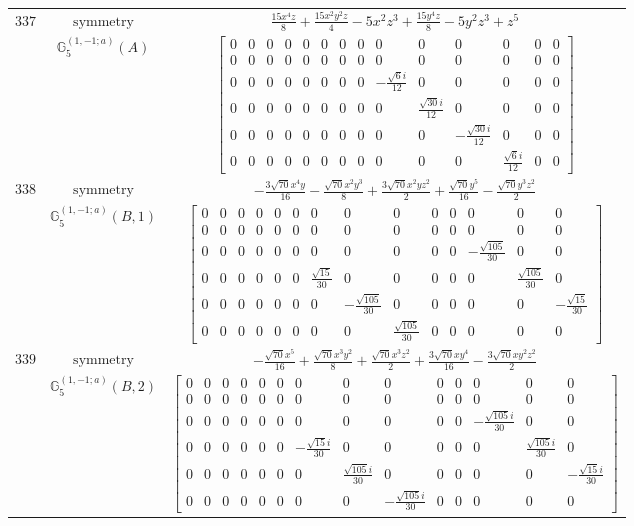 \documentclass[fleqn,8pt,landscape]{jsarticle}
\begin{document}
\begin{longtable}{ccc}
$ 337 $ & $ \text{symmetry} $ & $ \frac{15 x^{4} z}{8} + \frac{15 x^{2} y^{2} z}{4} - 5 x^{2} z^{3} + \frac{15 y^{4} z}{8} - 5 y^{2} z^{3} + z^{5} $ \\
$  $ & $ \mathbb{G}_{5}^{(1,-1;a)}(A) $ & $ \begin{bmatrix} 0 & 0 & 0 & 0 & 0 & 0 & 0 & 0 & 0 & 0 & 0 & 0 & 0 & 0 \\ 0 & 0 & 0 & 0 & 0 & 0 & 0 & 0 & 0 & 0 & 0 & 0 & 0 & 0 \\ 0 & 0 & 0 & 0 & 0 & 0 & 0 & 0 & - \frac{\sqrt{6} i}{12} & 0 & 0 & 0 & 0 & 0 \\ 0 & 0 & 0 & 0 & 0 & 0 & 0 & 0 & 0 & \frac{\sqrt{30} i}{12} & 0 & 0 & 0 & 0 \\ 0 & 0 & 0 & 0 & 0 & 0 & 0 & 0 & 0 & 0 & - \frac{\sqrt{30} i}{12} & 0 & 0 & 0 \\ 0 & 0 & 0 & 0 & 0 & 0 & 0 & 0 & 0 & 0 & 0 & \frac{\sqrt{6} i}{12} & 0 & 0 \end{bmatrix} $ \\ \hline
$ 338 $ & $ \text{symmetry} $ & $ - \frac{3 \sqrt{70} x^{4} y}{16} - \frac{\sqrt{70} x^{2} y^{3}}{8} + \frac{3 \sqrt{70} x^{2} y z^{2}}{2} + \frac{\sqrt{70} y^{5}}{16} - \frac{\sqrt{70} y^{3} z^{2}}{2} $ \\
$  $ & $ \mathbb{G}_{5}^{(1,-1;a)}(B,1) $ & $ \begin{bmatrix} 0 & 0 & 0 & 0 & 0 & 0 & 0 & 0 & 0 & 0 & 0 & 0 & 0 & 0 \\ 0 & 0 & 0 & 0 & 0 & 0 & 0 & 0 & 0 & 0 & 0 & 0 & 0 & 0 \\ 0 & 0 & 0 & 0 & 0 & 0 & 0 & 0 & 0 & 0 & 0 & - \frac{\sqrt{105}}{30} & 0 & 0 \\ 0 & 0 & 0 & 0 & 0 & 0 & \frac{\sqrt{15}}{30} & 0 & 0 & 0 & 0 & 0 & \frac{\sqrt{105}}{30} & 0 \\ 0 & 0 & 0 & 0 & 0 & 0 & 0 & - \frac{\sqrt{105}}{30} & 0 & 0 & 0 & 0 & 0 & - \frac{\sqrt{15}}{30} \\ 0 & 0 & 0 & 0 & 0 & 0 & 0 & 0 & \frac{\sqrt{105}}{30} & 0 & 0 & 0 & 0 & 0 \end{bmatrix} $ \\ \hline
$ 339 $ & $ \text{symmetry} $ & $ - \frac{\sqrt{70} x^{5}}{16} + \frac{\sqrt{70} x^{3} y^{2}}{8} + \frac{\sqrt{70} x^{3} z^{2}}{2} + \frac{3 \sqrt{70} x y^{4}}{16} - \frac{3 \sqrt{70} x y^{2} z^{2}}{2} $ \\
$  $ & $ \mathbb{G}_{5}^{(1,-1;a)}(B,2) $ & $ \begin{bmatrix} 0 & 0 & 0 & 0 & 0 & 0 & 0 & 0 & 0 & 0 & 0 & 0 & 0 & 0 \\ 0 & 0 & 0 & 0 & 0 & 0 & 0 & 0 & 0 & 0 & 0 & 0 & 0 & 0 \\ 0 & 0 & 0 & 0 & 0 & 0 & 0 & 0 & 0 & 0 & 0 & - \frac{\sqrt{105} i}{30} & 0 & 0 \\ 0 & 0 & 0 & 0 & 0 & 0 & - \frac{\sqrt{15} i}{30} & 0 & 0 & 0 & 0 & 0 & \frac{\sqrt{105} i}{30} & 0 \\ 0 & 0 & 0 & 0 & 0 & 0 & 0 & \frac{\sqrt{105} i}{30} & 0 & 0 & 0 & 0 & 0 & - \frac{\sqrt{15} i}{30} \\ 0 & 0 & 0 & 0 & 0 & 0 & 0 & 0 & - \frac{\sqrt{105} i}{30} & 0 & 0 & 0 & 0 & 0 \end{bmatrix} $ \\ \hline

\end{longtable}
\end{document}
